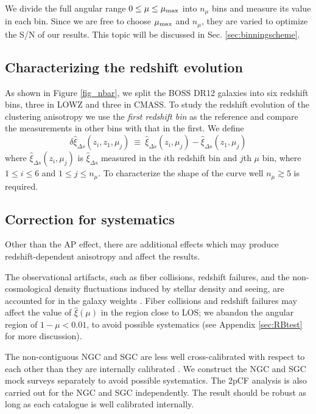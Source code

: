 \documentclass[iop]{emulateapj}
\begin{document}
We divide the full angular range $0\leq\mu\leq\mu_{\rm max}$ into $n_{\mu}$ bins and measure its value in each bin.
Since we are free to choose $\mu_{\rm max}$ and $n_{\mu}$,
they are varied to optimize the S/N of our results.
This topic will be discussed in Sec. \ref{sec:binningscheme}.

\subsection{Characterizing the redshift evolution}


As shown in Figure \ref{fig_nbar}, we split the BOSS DR12 galaxies into six redshift bins, three in LOWZ and three in CMASS.
To study the redshift evolution of the clustering anisotropy 
we use the {\it first redshift bin} as the reference and compare the measurements in other bins with that in the first.
We define
\begin{equation} \label{eq:deltahatxi}
\delta \hat\xi_{\Delta s}(z_i,z_1,\mu_j)\ \equiv\ \hat\xi_{\Delta s}(z_i,\mu_j) - \hat\xi_{\Delta s}(z_1,\mu_j)
\end{equation}
where $\hat\xi_{\Delta s}(z_i,\mu_j)$ is $\hat\xi_{\Delta s}$ measured in the $i$th redshift bin and $j$th $\mu$ bin,
where $1\leq i \leq 6$ and $1\leq j \leq n_{\mu}$.
To characterize the shape of the curve well $n_\mu \gtrsim5$ is required.

\subsection{Correction for systematics}\label{sec:syscor}

Other than the AP effect, there are additional effects 
which may produce redshift-dependent anisotropy and affect the results. 

The observational artifacts, such as fiber collisions, redshift failures, 
and the non-cosmological density fluctuations induced by stellar density and seeing,
are accounted for in the galaxy weights \citep{Reidetal:2016}.
Fiber collisions and redshift failures may affect the value of $\hat\xi(\mu)$ in the region close to LOS;
we abandon the angular region of $1-\mu<0.01$, 
to avoid possible systematics (see Appendix \ref{sec:RBtest} for more discussion). 

The non-contiguous NGC and SGC are less well cross-calibrated with respect to each other 
than they are internally calibrated \citep{Schlafly2010,SF2011,Parejko2013}.
We construct the NGC and SGC mock surveys separately to avoid possible systematics.
The 2pCF analysis is also carried out for the NGC and SGC independently.
The result should be robust as long as each catalogue is well calibrated internally.
\end{document}
